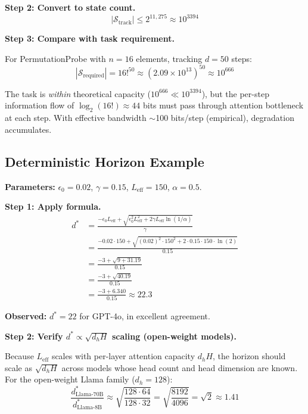 \documentclass{article}
\theoremstyle{plain}
\theoremstyle{definition}
\theoremstyle{remark}
\newcommand{\Leff}{L_{\mathrm{eff}}}
\begin{document}
\textbf{Step 2: Convert to state count.}
\begin{equation}
|\mathcal{S}_\text{track}| \leq 2^{11,275} \approx 10^{3394}
\end{equation}

\textbf{Step 3: Compare with task requirement.}

For PermutationProbe with $n=16$ elements, tracking $d=50$ steps:
\begin{equation}
|\mathcal{S}_\text{required}| = 16!^{50} \approx (2.09 \times 10^{13})^{50} \approx 10^{666}
\end{equation}

The task is \emph{within} theoretical capacity ($10^{666} \ll 10^{3394}$), but the per-step information flow of $\log_2(16!) \approx 44$ bits must pass through attention bottleneck at each step. With effective bandwidth $\sim$100 bits/step (empirical), degradation accumulates.

\subsection{Deterministic Horizon Example}

\textbf{Parameters:} $\epsilon_0 = 0.02$, $\gamma = 0.15$, $\Leff = 150$, $\alpha = 0.5$.

\textbf{Step 1: Apply formula.}
\begin{align}
d^* &= \frac{-\epsilon_0 \Leff + \sqrt{\epsilon_0^2 \Leff^2 + 2\gamma \Leff \ln(1/\alpha)}}{\gamma} \\
&= \frac{-0.02 \cdot 150 + \sqrt{(0.02)^2 \cdot 150^2 + 2 \cdot 0.15 \cdot 150 \cdot \ln(2)}}{0.15} \\
&= \frac{-3 + \sqrt{9 + 31.19}}{0.15} \\
&= \frac{-3 + \sqrt{40.19}}{0.15} \\
&= \frac{-3 + 6.340}{0.15} \approx 22.3
\end{align}

\textbf{Observed:} $d^* = 22$ for GPT-4o, in excellent agreement.

\textbf{Step 2: Verify $d^* \propto \sqrt{d_h H}$ scaling (open-weight models).}

Because $\Leff$ scales with per-layer attention capacity $d_h H$, the horizon should scale as $\sqrt{d_h H}$ across models whose head count and head dimension are known. For the open-weight Llama family ($d_h = 128$):
\begin{equation}
\frac{d^*_\text{Llama-70B}}{d^*_\text{Llama-8B}} \approx \sqrt{\frac{128 \cdot 64}{128 \cdot 32}} = \sqrt{\frac{8192}{4096}} = \sqrt{2} \approx 1.41
\end{equation}
\end{document}
